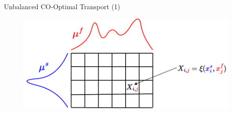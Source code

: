\documentclass{beamer}
\begin{document}
\begin{frame}{Unbalanced CO-Optimal Transport (1)}
  \vspace{-0.3cm}
  \begin{minipage}[t]{0.6\linewidth}
  \end{minipage}%
  \hfill%
  \begin{minipage}[t]{0.8\linewidth}
  \begin{figure}
    \centering
    \includegraphics[width=\linewidth, keepaspectratio=true]{OT_new/coot_matrix_single.pdf}
  \end{figure}
  \end{minipage}

\end{frame}
\end{document}
